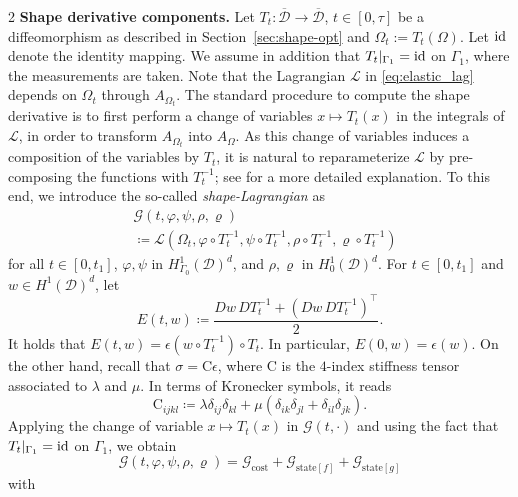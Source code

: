\documentclass[a4paper, oneside]{article}
\newcommand{\hold}{\mathcal{D}}
\newcommand{\Om}{\Omega}
\newcommand{\id}{\rm{id}}
\begin{document}
\begin{multicols}{2}
\textbf{Shape derivative components.}
Let $T_t:\overline{\hold}\to\overline{\hold}$, $t\in [0,\tau]$ be a diffeomorphism as described in Section~\ref{sec:shape-opt} and $\Om_t := T_t(\Om)$.
Let $\id$ denote the identity mapping.
We assume in addition that $T_t|_{\Gamma_1}=\id$ on $\Gamma_1$, where the measurements are taken.
Note that the Lagrangian $\mathcal{L}$ in \eqref{eq:elastic_lag} depends on $\Om_t$  through $A_{\Om_t}$.
The standard procedure to compute the shape derivative is to first perform a change of variables $x\mapsto T_t(x)$ in the integrals of $\mathcal{L}$, in order to transform $A_{\Om_t}$ into $A_{\Om}$.
As this change of variables induces a composition of the variables by $T_t$, it is natural to reparameterize $\mathcal{L}$ by pre-composing the functions with $T_t^{-1}$; see \cite{MR4531392} for a more detailed explanation. 
To this end, we introduce the so-called {\it shape-Lagrangian} as
\begin{align*}
	& \mathcal{G}(t,\varphi,\psi,\rho,\varrho) \\
	& \coloneqq \mathcal{L}\left(\Omega_{t},\varphi\circ T_{t}^{-1},\psi\circ T_{t}^{-1},\rho\circ T_{t}^{-1},\varrho\circ T_{t}^{-1}\right)
\end{align*}
for all $t\in[0, t_1]$, $\varphi,\psi$ in $H^1_{\Gamma_0}(\mathcal{D})^d$, and $\rho,\varrho$ in $H^1_0(\mathcal{D})^d$.
For $t\in[0, t_1]$ and $w \in H^1(\mathcal{D})^d$, let
\begin{equation*}
	E(t,w)\coloneqq\frac{Dw\,DT_{t}^{-1}+(Dw\,DT_{t}^{-1})^{\top}}{2}.
\end{equation*}
It holds that $E(t,w) = \epsilon\left(w\circ T_{t}^{-1}\right)\circ T_{t}$.
In particular, $E(0, w) = \epsilon(w)$.
On the other hand, recall that $\sigma = \mathrm{C}\epsilon$,
where $\mathrm{C}$ is the $4$-index stiffness tensor associated to
$\lambda$ and $\mu$. In terms of Kronecker symbols, it reads
\begin{equation}
	\mathrm{C}_{ijkl} \coloneqq \lambda \delta_{ij} \delta_{kl} + \mu(\delta_{ik}\delta_{jl} + \delta_{il}\delta_{jk}).
\end{equation}
Applying the change of variable $x \mapsto T_t(x)$ in $\mathcal{G}(t,\cdot)$ and using the fact that $T_t|_{\Gamma_1}=\id$ on $\Gamma_1$, we obtain
\begin{equation}
	\mathcal{G}(t,\varphi,\psi,\rho,\varrho) =
	\mathcal{G}_{\mathrm{cost}} +
	\mathcal{G}_{\mathrm{state}[f]} +
	\mathcal{G}_{\mathrm{state}[g]}
\end{equation}
with
\begin{align*}

\end{align*}
\end{multicols}
\end{document}
